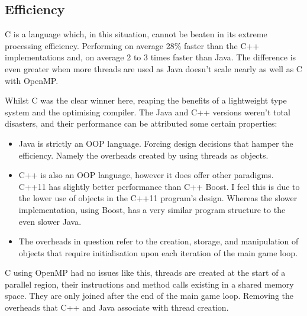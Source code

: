 \documentclass[11pt]{article} %
\begin{document}
\subsection{Efficiency}
C is a language which, in this situation, cannot be beaten in its extreme processing efficiency. Performing on average 28\% faster than the C++ implementations and, on average 2 to 3 times faster than Java. The difference is even greater when more threads are used as Java doesn't scale nearly as well as C with OpenMP. 

Whilst C was the clear winner here, reaping the benefits of a lightweight type system and the optimising compiler. The Java and C++ versions weren't total disasters, and their performance can be attributed some certain properties:
\begin{itemize}
\item Java is strictly an OOP language. Forcing design decisions that hamper the efficiency. Namely the overheads created by using threads as objects.
\item C++ is also an OOP language, however it does offer other paradigms. C++11 has slightly better performance than C++ Boost. I feel this is due to the lower use of objects in the C++11 program's design. Whereas the slower implementation, using Boost, has a very similar program structure to the even slower Java.
\item The overheads in question refer to the creation, storage, and manipulation of objects that require initialisation upon each iteration of the main game loop.
\end{itemize}
C using OpenMP had no issues like this, threads are created at the start of a parallel region, their instructions and method calls existing in a shared memory space. They are only joined after the end of the main game loop. Removing the overheads that C++ and Java associate with thread creation.
\end{document}
